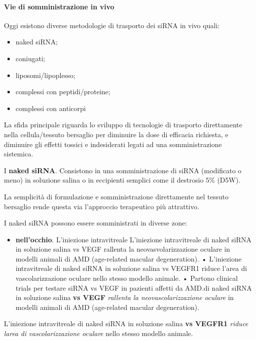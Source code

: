 \documentclass[]{article}
\begin{document}
\paragraph{Vie di somministrazione in
vivo}\label{vie-di-somministrazione-in-vivo}

Oggi esistono diverse metodologie di trasporto dei siRNA in vivo quali:

\begin{itemize}
\itemsep1pt\parskip0pt
\item
  naked siRNA;
\item
  coniugati;
\item
  liposomi/lipoplesso;
\item
  complessi con peptidi/proteine;
\item
  complessi con anticorpi
\end{itemize}

La sfida principale riguarda lo sviluppo di tecnologie di trasporto
direttamente nella cellula/tessuto bersaglio per diminuire la dose di
efficacia richiesta, e diminuire gli effetti tossici e indesiderati
legati ad una somministrazione sistemica.

I \textbf{naked siRNA}. Consistono in una somministrazione di siRNA
(modificato o meno) in soluzione salina o in eccipienti semplici come il
destrosio 5\% (D5W).

La semplicità di formulazione e somministrazione direttamente nel
tessuto bersaglio rende questa via l'approccio terapeutico più
attrattivo.

I naked siRNA possono essere somministrati in diverse zone:

\begin{itemize}
\itemsep1pt\parskip0pt
\item
  \textbf{nell'occhio}. L'iniezione intravitreale L'iniezione
  intravitreale di naked siRNA in soluzione salina vs VEGF rallenta la
  neovasvolarizzazione oculare in modelli animali di AMD (age-related
  macular degeneration). • L'iniezione intravitreale di naked siRNA in
  soluzione salina vs VEGFR1 riduce l'area di vascolarizzazione oculare
  nello stesso modello animale. • Partono clinical trials per testare
  siRNA vs VEGF in pazienti affetti da AMD.di naked siRNA in soluzione
  salina \textbf{vs VEGF} \emph{rallenta la neovascolarizzazione
  oculare} in modelli animali di AMD (age-related macular degeneration).
\end{itemize}

L'iniezione intravitreale di naked siRNA in soluzione salina \textbf{vs
VEGFR1} \emph{riduce larea di vascolarizzazione oculare} nello stesso
modello animale.
\end{document}
